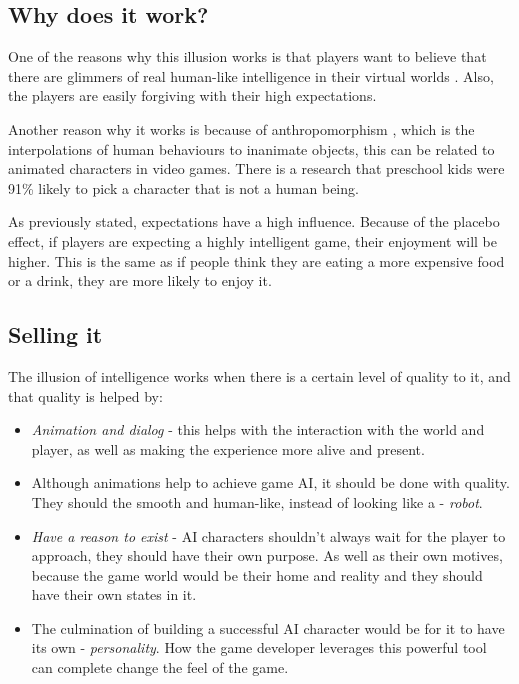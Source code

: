 \documentclass[a4paper, 12pt]{book}
\begin{document}
\subsection{Why does it work?}
One of the reasons why this illusion works is that players want to believe that there are glimmers of real human-like intelligence in their virtual worlds \cite{IllusionOfIntelligece}. Also, the players are easily forgiving with their high expectations.

Another reason why it works is because of anthropomorphism \cite{AnthropomorphicCharacters}, which is the interpolations of human behaviours to inanimate objects, this can be related to animated characters in video games. There is a research that preschool kids were 91\% likely to pick a character that is not a human being.

As previously stated, expectations have a high influence. Because of the placebo effect, if players are expecting a highly intelligent game, their enjoyment will be higher. This is the same as if people think they are eating a more expensive food or a drink, they are more likely to enjoy it.

\subsection{Selling it}
The illusion of intelligence \cite{IllusionOfIntelligece} works when there is a certain level of quality to it, and that quality is helped by:
\begin{itemize}
    \item \emph{Animation and dialog} - this helps with the interaction with the world and player, as well as making the experience more alive and present.
    \item Although animations help to achieve game AI, it should be done with quality. They should the smooth and human-like, instead of looking like a - \emph{robot}.
    \item \emph{Have a reason to exist} - AI characters shouldn't always wait for the player to approach, they should have their own purpose. As well as their own motives, because the game world would be their home and reality and they should have their own states in it.
    \item The culmination of building a successful AI character would be for it to have its own - \emph{personality}. How the game developer leverages this powerful tool can complete change the feel of the game.
\end{itemize}
\end{document}
